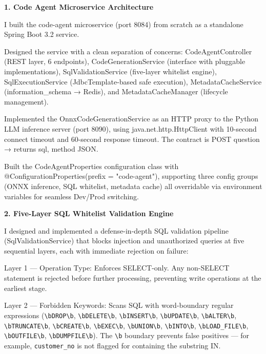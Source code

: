 \textbf{1. Code Agent Microservice Architecture}

I built the code-agent microservice (port 8084) from scratch as a standalone Spring Boot 3.2 service.

Designed the service with a clean separation of concerns: CodeAgentController (REST layer, 6 endpoints), CodeGenerationService (interface with pluggable implementations), SqlValidationService (five-layer whitelist engine), SqlExecutionService (JdbcTemplate-based safe execution), MetadataCacheService (information\_schema → Redis), and MetadataCacheManager (lifecycle management).

Implemented the OnnxCodeGenerationService as an HTTP proxy to the Python LLM inference server (port 8090), using java.net.http.HttpClient with 10-second connect timeout and 60-second response timeout. The contract is POST {question} → returns {sql, method} JSON.

Built the CodeAgentProperties configuration class with @ConfigurationProperties(prefix = "code-agent"), supporting three config groups (ONNX inference, SQL whitelist, metadata cache) all overridable via environment variables for seamless Dev/Prod switching.

\textbf{2. Five-Layer SQL Whitelist Validation Engine}

I designed and implemented a defense-in-depth SQL validation pipeline (SqlValidationService) that blocks injection and unauthorized queries at five sequential layers, each with immediate rejection on failure:

Layer 1 — Operation Type: Enforces SELECT-only. Any non-SELECT statement is rejected before further processing, preventing write operations at the earliest stage.

Layer 2 — Forbidden Keywords: Scans SQL with word-boundary regular expressions (\texttt{\textbackslash bDROP\textbackslash b}, \texttt{\textbackslash bDELETE\textbackslash b}, \texttt{\textbackslash bINSERT\textbackslash b}, \texttt{\textbackslash bUPDATE\textbackslash b}, \texttt{\textbackslash bALTER\textbackslash b}, \texttt{\textbackslash bTRUNCATE\textbackslash b}, \texttt{\textbackslash bCREATE\textbackslash b}, \texttt{\textbackslash bEXEC\textbackslash b}, \texttt{\textbackslash bUNION\textbackslash b}, \texttt{\textbackslash bINTO\textbackslash b}, \texttt{\textbackslash bLOAD\_FILE\textbackslash b}, \texttt{\textbackslash bOUTFILE\textbackslash b}, \texttt{\textbackslash bDUMPFILE\textbackslash b}). The \texttt{\textbackslash b} boundary prevents false positives — for example, \texttt{customer\_no} is not flagged for containing the substring IN.

